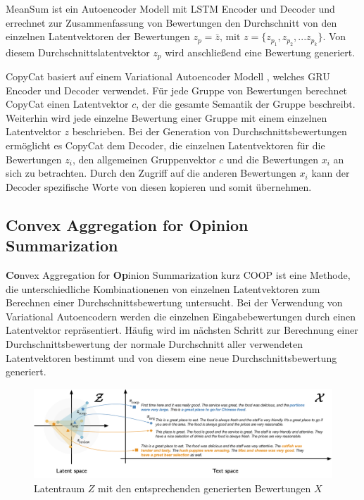 MeanSum ist ein Autoencoder Modell \citep{meansum} mit LSTM Encoder und Decoder und errechnet zur Zusammenfassung von Bewertungen den Durchschnitt von den einzelnen Latentvektoren der Bewertungen $z_p = \bar{z} \text{, mit } z=\{z_{p_1},z_{p_2},...z_{p_k}\}$.
Von diesem Durchschnittslatentvektor $z_p$ wird anschließend eine Bewertung generiert. 


CopyCat basiert auf einem Variational Autoencoder Modell \citep{copycat}, welches GRU Encoder und Decoder verwendet. 
Für jede Gruppe von Bewertungen berechnet CopyCat einen Latentvektor $c$, der die gesamte Semantik der Gruppe beschreibt. 
Weiterhin wird jede einzelne Bewertung einer Gruppe mit einem einzelnen Latentvektor $z$ beschrieben.
Bei der Generation von Durchschnittsbewertungen ermöglicht es CopyCat dem Decoder, die einzelnen Latentvektoren für die Bewertungen $z_i$, den allgemeinen Gruppenvektor $c$ und die Bewertungen $x_i$ an sich zu betrachten.
Durch den Zugriff auf die anderen Bewertungen $x_i$ kann der Decoder spezifische Worte von diesen \glqq kopieren\grqq{}  und somit übernehmen.



\subsection{Convex Aggregation for Opinion Summarization}
\label{coop_chap}
\textbf{Co}nvex Aggregation for \textbf{Op}inion Summarization kurz COOP \citep{coop} ist eine Methode, die unterschiedliche Kombinationenen von einzelnen Latentvektoren zum Berechnen einer Durchschnittsbewertung untersucht.
Bei der Verwendung von Variational Autoencodern werden die einzelnen Eingabebewertungen durch einen Latentvektor repräsentiert. 
Häufig wird im nächsten Schritt zur Berechnung einer Durchschnittsbewertung der normale Durchschnitt aller verwendeten Latentvektoren bestimmt und von diesem eine neue Durchschnittsbewertung generiert.

\begin{figure}[h]
    \centering
    \includegraphics[width=\textwidth]{bilder/coop}
    \caption{Latentraum $Z$ mit den entsprechenden generierten Bewertungen $X$ \citep{coop}}
    \label{coop_fig}
\end{figure}

